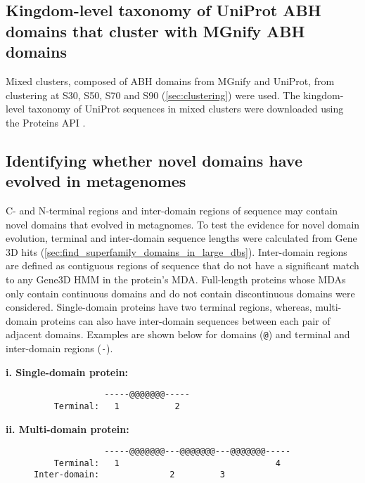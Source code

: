 \subsection{Kingdom-level taxonomy of UniProt ABH domains that cluster with MGnify ABH domains}

Mixed clusters, composed of ABH domains from MGnify and UniProt, from clustering at S30, S50, S70 and S90 (\ref{sec:clustering}) were used. The kingdom-level taxonomy of UniProt sequences in mixed clusters were downloaded using the Proteins API \cite{Nightingale2017}.


\subsection{Identifying whether novel domains have evolved in metagenomes}
\label{sec:intro-novel-domain}

C- and N-terminal regions and inter-domain regions of sequence may contain novel domains that evolved in metagnomes. To test the evidence for novel domain evolution, terminal and inter-domain sequence lengths were calculated from Gene$3$D hits (\ref{sec:find_superfamily_domains_in_large_dbs}). Inter-domain regions are defined as contiguous regions of sequence that do not have a significant match to any Gene$3$D HMM in the protein's MDA. Full-length proteins whose MDAs only contain continuous domains and do not contain discontinuous domains were considered. Single-domain proteins have two terminal regions, whereas, multi-domain proteins can also have inter-domain sequences between each pair of adjacent domains. Examples are shown below for domains (\texttt{@}) and terminal and inter-domain regions (\texttt{-}).

\noindent \textbf{i. Single-domain protein:}

\begin{figure}[H]
\begin{verbatim}
              -----@@@@@@@-----
    Terminal:   1           2
\end{verbatim}
\end{figure}

\noindent \textbf{ii. Multi-domain protein:}

\begin{figure}[H]
\begin{verbatim}
              -----@@@@@@@---@@@@@@@---@@@@@@@-----
    Terminal:   1                               4
Inter-domain:              2         3
\end{verbatim}
\end{figure}


